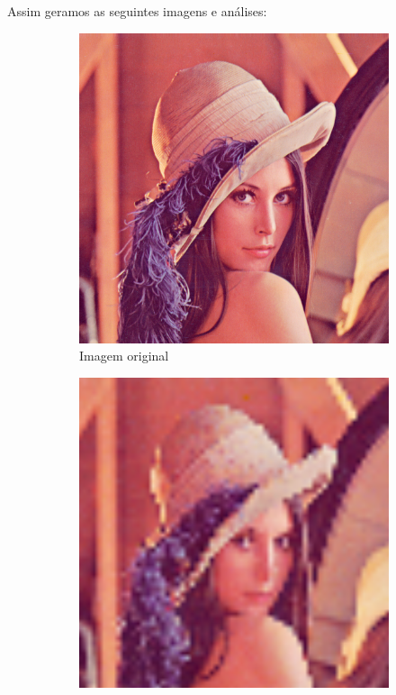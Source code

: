 \documentclass[12pt, a4paper]{article}
\begin{document}
    Assim geramos as seguintes imagens e análises:
    \begin{figure}[h]
        \begin{subfigure}{.3\textwidth}
            \includegraphics[width=.95\textwidth]{../lenacrop.png}
            \caption{Imagem original\\}
        \end{subfigure}
        \begin{subfigure}{.3\textwidth}
            \includegraphics[width=.95\textwidth]{../lenaBL7.png}

\end{subfigure}
\end{figure}
\end{document}
